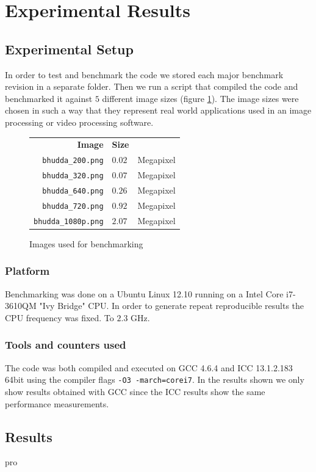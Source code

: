 \section{Experimental Results}\label{sec:exp}
\subsection{Experimental Setup}\label{sec:exp_setup8}
In order to test and benchmark the code we stored each major benchmark revision in a separate folder. Then we run a script that compiled the code and benchmarked it against $5$ different image sizes (figure \ref{tab:images}). The image sizes were chosen in such a way that they represent real world applications used in an image processing or video processing software.
\begin{figure}
\centering
\begin{tabular}{rll}
\textbf{Image} & \textbf{Size}\\
\texttt{bhudda\_200.png} & $0.02$ & Megapixel\\
\texttt{bhudda\_320.png} & $0.07$ & Megapixel\\
\texttt{bhudda\_640.png} & $0.26$ & Megapixel\\
\texttt{bhudda\_720.png} & $0.92$ & Megapixel\\
\texttt{bhudda\_1080p.png} & $2.07$ & Megapixel\\
\end{tabular}
\caption{Images used for benchmarking}
\label{tab:images}
\end{figure}

\subsubsection{Platform}
Benchmarking was done on a Ubuntu Linux 12.10 running on a Intel Core i7-3610QM "Ivy Bridge" CPU. In order to generate repeat reproducible results the CPU frequency was fixed. To $2.3$ GHz.
\subsubsection{Tools and counters used}
The code was both compiled and executed on GCC 4.6.4 and ICC 13.1.2.183 64bit using the compiler flags \lstinline{-O3 -march=corei7}. In the results shown we only show results obtained with GCC since the ICC results show the same performance measurements.
\subsection{Results}
pro
\setlength\fboxsep{0pt}
\setlength\fboxrule{0.5pt}
 
